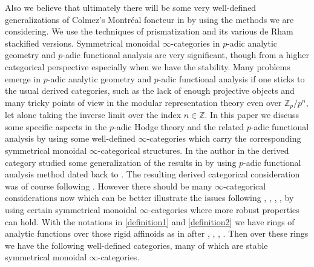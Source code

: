\documentclass[12pt]{article}
\theoremstyle{definition}
\begin{document}
Also we believe that ultimately there will be some very well-defined generalizations of Colmez's Montr\'eal foncteur in \cite{C} by using the methods we are considering. We use the techniques of prismatization and its various de Rham stackified versions. Symmetrical monoidal $\infty$-categories in $p$-adic analytic geometry and $p$-adic functional analysis are very significant, though from a higher categorical perspective especially when we have the stability. Many problems emerge in $p$-adic analytic geometry and $p$-adic functional analysis if one sticks to the usual derived categories, such as the lack of enough projective objects and many tricky points of view in the modular representation theory even over $\mathbb{Z}_p/p^n$, let alone taking the inverse limit over the index $n\in \mathbb{Z}$. In this paper we discuss some specific aspects in the $p$-adic Hodge theory and the related $p$-adic functional analysis by using some well-defined $\infty$-categories which carry the corresponding symmetrical monoidal $\infty$-categorical structures. In \cite{T} the author in the derived category studied some generalization of the results in \cite{KPX} by using $p$-adic functional analysis method dated back to \cite{K1}. The resulting derived categorical consideration was of course following \cite{KPX}. However there should be many $\infty$-categorical considerations now which can be better illustrate the issues following \cite{BBBK}, \cite{BBKK}, \cite{CS1}, \cite{CS2}, \cite{CS3} by using certain symmetrical monoidal $\infty$-categories where more robust properties can hold. With the notations in \cref{definition1} and \cref{definition2} we have rings of analytic functions over those rigid affinoids as in \cite{T} after \cite{KPX}, \cite{CKZ}, \cite{PZ}, \cite{1Z}. Then over these rings we have the following well-defined categories, many of which are stable symmetrical monoidal $\infty$-categories.
\end{document}

